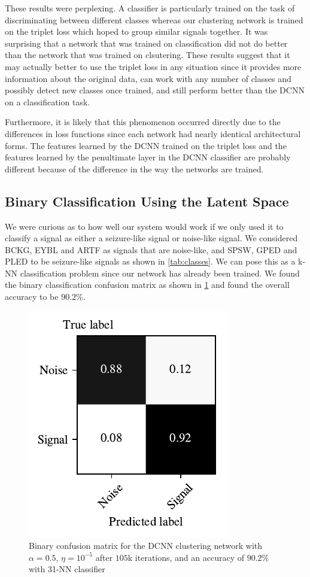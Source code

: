 These results were perplexing. A classifier is particularly trained on the task of discriminating between different classes whereas our clustering network is trained on the triplet loss which hoped to group similar signals together. It was surprising that a network that was trained on classification did not do better than the network that was trained on clsutering. These results suggest that it may actually better to use the triplet loss in any situation since it provides more information about the original data, can work with any number of classes and possibly detect new classes once trained, and still perform better than the DCNN on a classification task. 

Furthermore, it is likely that this phenomenon occurred directly due to the differences in loss functions since each network had nearly identical architectural forms. The features learned by the DCNN trained on the triplet loss and the features learned by the penultimate layer in the DCNN classifier are probably different because of the difference in the way the networks are trained.

\subsection{Binary Classification Using the Latent Space}

We were curious as to how well our system would work if we only used it to classify a signal as either a seizure-like signal or noise-like signal.  We considered BCKG, EYBL and ARTF as signals that are noise-like, and SPSW, GPED and PLED to be seizure-like signals as shown in \cref{tab:classes}. We can pose this as a k-NN classification problem since our network has already been trained. We found the binary classification confusion matrix as shown in \cref{fig:conf_mat_exp_pooled} and found the overall accuracy to be $90.2\%$.

\begin{figure}[!ht]
	\centering
	\includegraphics[width=0.425\linewidth]{pictures/conf_mat_exp_pooled.pdf}
	\caption[Binary Confusion Matrix for  the DCNN Clustering Network]{Binary confusion matrix for the DCNN clustering network with $\alpha = 0.5$, $\eta = 10^{-5}$ after $105$k iterations, and an accuracy of $90.2\%$ with 31-NN classifier}\label{fig:conf_mat_exp_pooled}
\end{figure}

